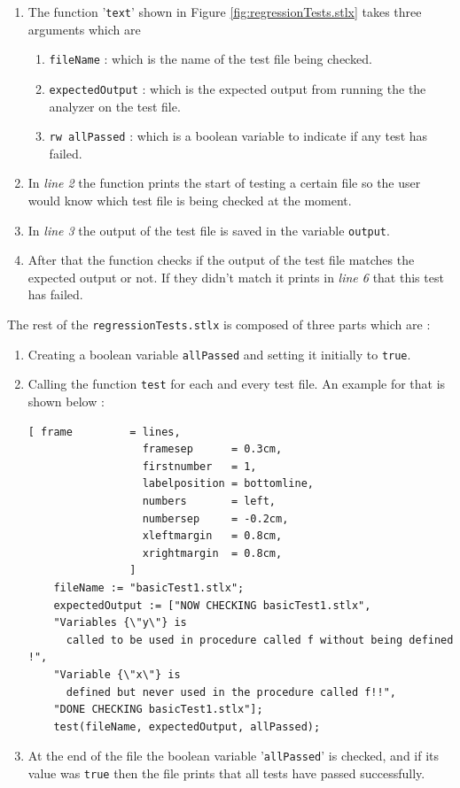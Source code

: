 \documentclass[11pt]{report}
\begin{document}
\begin{enumerate}
\item The function '\texttt{text}' shown in Figure \ref{fig:regressionTests.stlx} takes three arguments which are 
	\begin{enumerate}
	\item \texttt{fileName} : which is the name of the 			test file being checked.
	\item \texttt{expectedOutput} : which is the expected 	output from running the the analyzer on the test 			file.
	\item \texttt{rw allPassed} : which is a boolean 			variable to indicate if any test has failed.
	\end{enumerate}

\item In \textsl{line 2} the function prints the start of testing a certain file so the user would know which test file is being checked at the moment.

\item In \textsl{line 3} the output of the test file is saved in the variable \texttt{output}.

\item After that the function checks if the output of the test file matches the expected output or not. If they didn't match it prints in \textsl{line 6} that this test has failed.
\end{enumerate}

The rest of the \texttt{regressionTests.stlx} is composed of three parts which are :
\begin{enumerate}
\item Creating a boolean variable \texttt{allPassed} and setting it initially to \texttt{true}.

\item Calling the function \texttt{test} for each and every test file. An example for that is shown below :
\begin{Verbatim}[ frame         = lines, 
                  framesep      = 0.3cm, 
                  firstnumber   = 1,
                  labelposition = bottomline,
                  numbers       = left,
                  numbersep     = -0.2cm,
                  xleftmargin   = 0.8cm,
                  xrightmargin  = 0.8cm,
                ]
    fileName := "basicTest1.stlx";
    expectedOutput := ["NOW CHECKING basicTest1.stlx", 
	"Variables {\"y\"} is 
	  called to be used in procedure called f without being defined !", 
	"Variable {\"x\"} is 
	  defined but never used in the procedure called f!!", 
	"DONE CHECKING basicTest1.stlx"];
    test(fileName, expectedOutput, allPassed);
\end{Verbatim}

\item At the end of the file the boolean variable '\texttt{allPassed}' is checked, and if its value was \texttt{true} then the file prints that all tests have passed successfully.
\end{enumerate}
\end{document}
